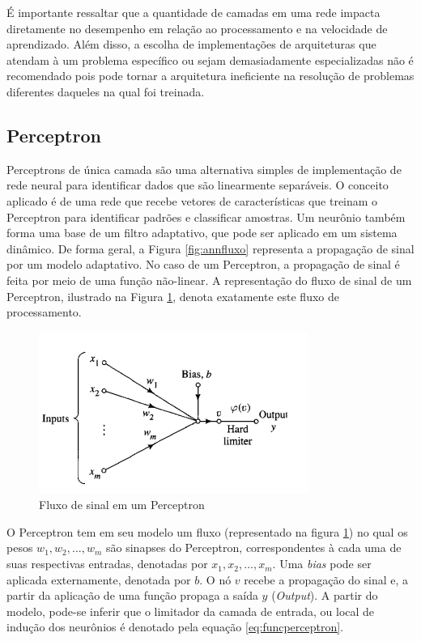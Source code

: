 É importante ressaltar que a quantidade de camadas em uma rede impacta diretamente no desempenho em relação ao processamento e na velocidade de aprendizado. Além disso, a escolha de implementações de arquiteturas que atendam à um problema específico ou sejam demasiadamente especializadas não é recomendado pois pode tornar a arquitetura ineficiente na resolução de problemas diferentes daqueles na qual foi treinada. 

\subsection{Perceptron}

Perceptrons de única camada são uma alternativa simples de implementação de rede neural para identificar dados que são linearmente separáveis. O conceito aplicado é de uma rede que recebe vetores de características que treinam o Perceptron para identificar padrões e classificar amostras. Um neurônio também forma uma base de um filtro adaptativo, que pode ser aplicado em um sistema dinâmico. De forma geral, a Figura \ref{fig:annfluxo} representa a propagação de sinal por um modelo adaptativo. No caso de um Perceptron, a propagação de sinal é feita por meio de uma função não-linear. A representação do fluxo de sinal de um Perceptron, ilustrado na Figura \ref{fig:perceptron}, denota exatamente este fluxo de processamento. 
	
\begin{figure}[ht!]
	\caption{Fluxo de sinal em um Perceptron}
	\label{fig:perceptron}
	\begin{center}
		\includegraphics[scale=0.8]{img/perceptron.png}
	\end{center}
\end{figure}	

O Perceptron tem em seu modelo um fluxo (representado na figura \ref{fig:perceptron}) no qual os pesos $w_1, w_2, ... , w_m$ são sinapses do Perceptron, correspondentes à cada uma de suas respectivas entradas, denotadas por $x_1, x_2, ... , x_m$. Uma \textit{bias} pode ser aplicada externamente, denotada por $b$. O nó $ v $ recebe a propagação do sinal e, a partir da aplicação de uma função propaga a saída $y$ (\textit{Output}). A partir do modelo, pode-se inferir que o limitador da camada de entrada, ou local de indução dos neurônios é denotado pela equação \ref{eq:funcperceptron}.  

